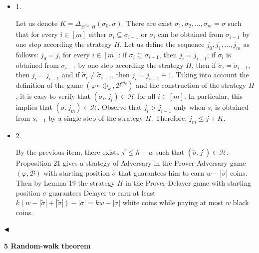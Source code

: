 \begin{itemize}


\item 
1. 


Let us denote $K=\Delta_{\mathcal{B}^{\oplus_{k}},H}(\sigma_{0},\sigma)$.
There are exist $\sigma_{1},\sigma_{2},\dots,\sigma_{m}=\sigma$ such that
for every $i\in[m]$ either
$\sigma_{i}\subseteq\sigma_{i-1}$ or $\sigma_{i}$ can be obtained from $\sigma_{i-1}$ by one step according the strategy $H$.
Let us define the sequence $j_{0},j_{1},\dots,j_{m}$ as follows: $j_{0}=j$, for every $i\in[m]$:
if $\sigma_{i}\subseteq\sigma_{i-1}$, then $j_{i}=j_{i-1}$;
if $\sigma_{i}$ is obtained from $\sigma_{i-1}$ by one step according the strategy $H$, then if $\tilde{\sigma}_{i}=\tilde{\sigma}_{i-1}$,
then $j_{i}=j_{i-1}$ and if $\tilde{\sigma}_{i}\neq\tilde{\sigma}_{i-1}$, then $j_{i}=j_{i-1}+1$.
Taking into account the definition of the game $(\varphi\circ\oplus_{k},\mathcal{B}^{\oplus_{k}})$ and the construction of the strategy $H$, it is easy to verify that $(\tilde{\sigma}_{i},j_{i})\in\mathcal{H}$ for all $i\in[m]$. In particular, this implies that $(\tilde{\sigma},j_{m})\in\mathcal{H}$.
Observe that $j_{i}>j_{i-1}$ only when $s_{i}$ is obtained from $s_{i-1}$ by a single step of the strategy $H$. Therefore, $j_{m}\leq j+K$.\par





\item 
2. 


By the previous item, there exists $j^{\prime}\leq h-w$ such that $(\tilde{\sigma},j^{\prime})\in\mathcal{H}$. Proposition 21 gives a strategy of Adversary in the Prover-Adversary game $(\varphi,\mathcal{B})$ with starting position $\tilde{\sigma}$ that guarantees him to earn $w-|\tilde{\sigma}|$ coins. Then by Lemma 19 the strategy $H$ in the Prover-Delayer game with starting position $\sigma$ guarantees Delayer to earn at least $k(w-|\tilde{\sigma}|+|\tilde{\sigma}|)-|\sigma|=kw-|\sigma|$ white coins while paying at most $w$ black coins.\par





\end{itemize}


$\hfill\blacktriangleleft$\par


\par\medskip\noindent\textbf{
5 Random-walk theorem}\par


